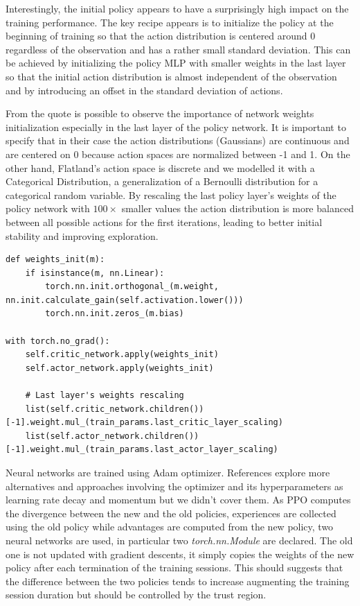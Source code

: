 \documentclass[11pt, a4paper, hidelinks]{report}
\begin{document}
\begin{quoting}[font=itshape, begintext={"}, endtext={"\citep{ppo-implementation-2}}]
Interestingly, the initial policy appears to have a surprisingly high impact on the training performance.
The key recipe appears is to initialize the policy at the beginning of training so that the action distribution is centered around 0 regardless of the observation and has a rather small standard deviation.
This can be achieved by initializing the policy MLP with smaller weights in the last layer so that the initial action distribution is almost independent of the observation and by introducing an offset in the standard deviation of actions.
\end{quoting}

From the quote is possible to observe the importance of network weights initialization especially in the last layer of the policy network.
It is important to specify that in their case the action distributions (Gaussians) are continuous and are centered on 0 because action spaces are normalized between -1 and 1.
On the other hand, Flatland's action space is discrete and we modelled it with a Categorical Distribution, a generalization of a Bernoulli distribution for a categorical random variable.
By rescaling the last policy layer's weights of the policy network with $100\times$ smaller values the action distribution is more balanced between all possible actions for the first iterations, leading to better initial stability and improving exploration.

\begin{lstlisting}[label={lst:psppo-net-init}]
def weights_init(m):
	if isinstance(m, nn.Linear):
		torch.nn.init.orthogonal_(m.weight, nn.init.calculate_gain(self.activation.lower()))
		torch.nn.init.zeros_(m.bias)

with torch.no_grad():
	self.critic_network.apply(weights_init)
	self.actor_network.apply(weights_init)

	# Last layer's weights rescaling
	list(self.critic_network.children())[-1].weight.mul_(train_params.last_critic_layer_scaling)
	list(self.actor_network.children())[-1].weight.mul_(train_params.last_actor_layer_scaling)
\end{lstlisting}

Neural networks are trained using Adam optimizer.
References explore more alternatives and approaches involving the optimizer and its hyperparameters as learning rate decay and momentum but we didn't cover them.
As PPO computes the divergence between the new and the old policies, experiences are collected using the old policy while advantages are computed from the new policy, two neural networks are used, in particular two \textit{torch.nn.Module} are declared.
The old one is not updated with gradient descents, it simply copies the weights of the new policy after each termination of the training sessions.
This should suggests that the difference between the two policies tends to increase augmenting the training session duration but should be controlled by the trust region.
\end{document}
